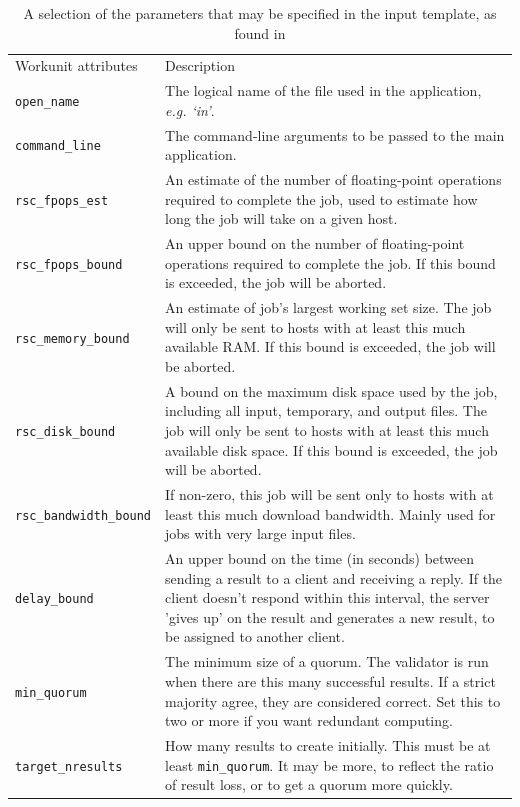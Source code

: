 \begin{table} 
\caption{A selection of the parameters that may be specified in the input template, as found in \cite{boincwiki} }
\begin{tabular}{lp{11.5cm}}\toprule
Workunit attributes & Description \cite{boincwiki} \\ \cmidrule(r){1-2}
\verb|open_name| & The logical name of the file used in the application, \emph{e.g. `in'}.\\
\verb|command_line| & The command-line arguments to be passed to the main  application.  \\
\verb|rsc_fpops_est| &
An estimate of the number of floating-point operations required to complete the job, used to estimate how long the job will take on a given host.\\
\verb|rsc_fpops_bound| &
An upper bound on the number of floating-point operations required to complete the job. If this bound is exceeded, the job will be aborted.\\
\verb|rsc_memory_bound| &
An estimate of job's largest working set size. The job will only be sent to hosts with at least this much available RAM. If this bound is exceeded, the job will be aborted.
\\
\verb|rsc_disk_bound| &
A bound on the maximum disk space used by the job, including all input, temporary, and output files. The job will only be sent to hosts with at least this much available disk space. If this bound is exceeded, the job will be aborted.\\
\verb|rsc_bandwidth_bound| &
If non-zero, this job will be sent only to hosts with at least this much download bandwidth. Mainly used for jobs with very large input files. \\
\verb|delay_bound| &An upper bound on the time (in seconds) between sending a result to a client and receiving a reply.  If the client doesn't respond within this interval, the server 'gives up' on the result and generates a new result, to be assigned to another client.  
\\
\verb|min_quorum| &
The minimum size of a quorum. The validator is run when there are this many successful results. If a strict majority agree, they are considered correct. Set this to two or more if you want redundant computing.
\\
\verb|target_nresults| &
How many results to create initially. This must be at least \verb|min_quorum|. It may be more, to reflect the ratio of result loss, or to get a quorum more quickly.
\\

\end{tabular}
\end{table}
